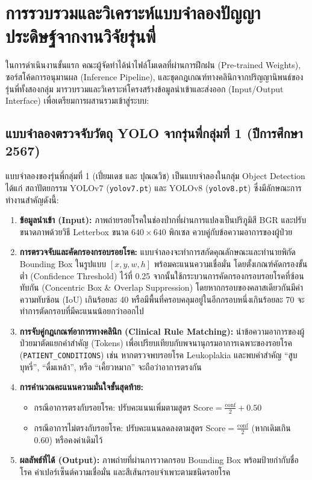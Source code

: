 \section{การรวบรวมและวิเคราะห์แบบจำลองปัญญาประดิษฐ์จากงานวิจัยรุ่นพี่}
\label{sec:ai_model_consolidation}

ในการดำเนินงานขั้นแรก คณะผู้จัดทำได้นำไฟล์โมเดลที่ผ่านการฝึกฝน (Pre-trained Weights), ซอร์สโค้ดการอนุมานผล (Inference Pipeline), และชุดกฎเกณฑ์ทางคลินิกจากปริญญานิพนธ์ของรุ่นพี่ทั้งสองกลุ่ม มารวบรวมและวิเคราะห์โครงสร้างข้อมูลนำเข้าและส่งออก (Input/Output Interface) เพื่อเตรียมการผสานรวมเข้าสู่ระบบ:

\subsection{แบบจำลองตรวจจับวัตถุ YOLO จากรุ่นพี่กลุ่มที่ 1 (ปีการศึกษา 2567)}
แบบจำลองของรุ่นพี่กลุ่มที่ 1 (เปี่ยมเดช และ ปุณณวิช) \cite{piamdech2024oral} เป็นแบบจำลองในกลุ่ม Object Detection ได้แก่ สถาปัตยกรรม YOLOv7 (\texttt{yolov7.pt}) และ YOLOv8 (\texttt{yolov8.pt}) ซึ่งมีลักษณะการทำงานสำคัญดังนี้:
\begin{enumerate}
    \item \textbf{ข้อมูลนำเข้า (Input):} ภาพถ่ายรอยโรคในช่องปากที่ผ่านการแปลงเป็นปริภูมิสี BGR และปรับขนาดภาพด้วยวิธี Letterbox ขนาด $640 \times 640$ พิกเซล ควบคู่กับข้อความอาการของผู้ป่วย
    \item \textbf{การตรวจจับและคัดกรองกรอบรอยโรค:} แบบจำลองจะทำการสกัดคุณลักษณะและทำนายพิกัด Bounding Box ในรูปแบบ $[x, y, w, h]$ พร้อมคะแนนความเชื่อมั่น โดยตั้งเกณฑ์คัดกรองขั้นต่ำ (Confidence Threshold) ไว้ที่ 0.25 จากนั้นใช้กระบวนการคัดกรองกรอบรอยโรคที่ซ้อนทับกัน (Concentric Box \& Overlap Suppression) โดยหากกรอบของคลาสเดียวกันมีค่าความทับซ้อน (IoU) เกินร้อยละ 40 หรือมีพื้นที่ครอบคลุมอยู่ในอีกกรอบหนึ่งเกินร้อยละ 70 จะทำการตัดกรอบที่มีคะแนนน้อยกว่าออกไป
    \item \textbf{การจับคู่กฎเกณฑ์อาการทางคลินิก (Clinical Rule Matching):} นำข้อความอาการของผู้ป่วยมาตัดแยกคำสำคัญ (Tokens) เพื่อเปรียบเทียบกับพจนานุกรมอาการเฉพาะของรอยโรค (\texttt{PATIENT\_CONDITIONS}) เช่น หากตรวจพบรอยโรค Leukoplakia และพบคำสำคัญ ``สูบบุหรี่'', ``ดื่มเหล้า'', หรือ ``เคี้ยวหมาก'' จะถือว่าอาการตรงกัน
    \item \textbf{การคำนวณคะแนนความมั่นใจขั้นสุดท้าย:}
    \begin{itemize}
        \item กรณีอาการตรงกับรอยโรค: ปรับคะแนนเพิ่มตามสูตร $\text{Score} = \frac{\text{conf}}{2} + 0.50$
        \item กรณีอาการไม่ตรงกับรอยโรค: ปรับคะแนนลดลงตามสูตร $\text{Score} = \frac{\text{conf}}{2}$ (หากเดิมเกิน 0.60) หรือคงค่าเดิมไว้
    \end{itemize}
    \item \textbf{ผลลัพธ์ที่ได้ (Output):} ภาพถ่ายที่ผ่านการวาดกรอบ Bounding Box พร้อมป้ายกำกับชื่อโรค ค่าเปอร์เซ็นต์ความเชื่อมั่น และสีเส้นกรอบจำเพาะตามชนิดรอยโรค
\end{enumerate}


